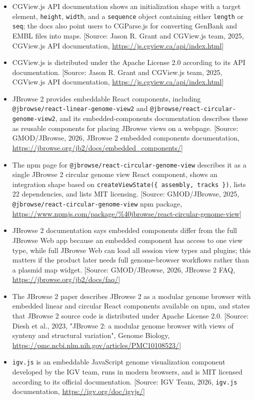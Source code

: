\documentclass[11pt]{report}
\begin{document}
\begin{itemize}
\item CGView.js API documentation shows an initialization shape with a target element, \texttt{height}, \texttt{width}, and a \texttt{sequence} object containing either \texttt{length} or \texttt{seq}; the docs also point users to CGParse.js for converting GenBank and EMBL files into maps. [Source: Jason R. Grant and CGView.js team, 2025, CGView.js API documentation, \url{https://js.cgview.ca/api/index.html}]
\item CGView.js is distributed under the Apache License 2.0 according to its API documentation. [Source: Jason R. Grant and CGView.js team, 2025, CGView.js API documentation, \url{https://js.cgview.ca/api/index.html}]
\item JBrowse 2 provides embeddable React components, including \texttt{@jbrowse/react-linear-genome-view2} and \texttt{@jbrowse/react-circular-genome-view2}, and its embedded-components documentation describes these as reusable components for placing JBrowse views on a webpage. [Source: GMOD/JBrowse, 2026, JBrowse 2 embedded components documentation, \url{https://jbrowse.org/jb2/docs/embedded_components/}]
\item The npm page for \texttt{@jbrowse/react-circular-genome-view} describes it as a single JBrowse 2 circular genome view React component, shows an integration shape based on \texttt{createViewState(\{ assembly, tracks \})}, lists 22 dependencies, and lists MIT licensing. [Source: GMOD/JBrowse, 2025, \texttt{@jbrowse/react-circular-genome-view} npm package, \url{https://www.npmjs.com/package/\%40jbrowse/react-circular-genome-view}]
\item JBrowse 2 documentation says embedded components differ from the full JBrowse Web app because an embedded component has access to one view type, while full JBrowse Web can load all session view types and plugins; this matters if the product later needs full genome-browser workflows rather than a plasmid map widget. [Source: GMOD/JBrowse, 2026, JBrowse 2 FAQ, \url{https://jbrowse.org/jb2/docs/faq/}]
\item The JBrowse 2 paper describes JBrowse 2 as a modular genome browser with embedded linear and circular React components available on npm, and states that JBrowse 2 source code is distributed under Apache License 2.0. [Source: Diesh et al., 2023, "JBrowse 2: a modular genome browser with views of synteny and structural variation", Genome Biology, \url{https://pmc.ncbi.nlm.nih.gov/articles/PMC10108523/}]
\item \texttt{igv.js} is an embeddable JavaScript genome visualization component developed by the IGV team, runs in modern browsers, and is MIT licensed according to its official documentation. [Source: IGV Team, 2026, \texttt{igv.js} documentation, \url{https://igv.org/doc/igvjs/}]

\end{itemize}
\end{document}
